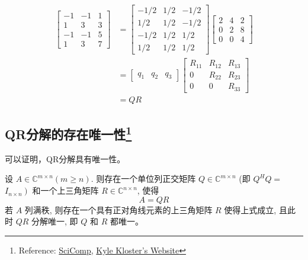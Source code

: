 \begin{example}
    $$
\begin{aligned}
\left[\begin{array}{rrr}
-1 & -1 & 1 \\
1 & 3 & 3 \\
-1 & -1 & 5 \\
1 & 3 & 7
\end{array}\right] &=\left[\begin{array}{rrr}
-1 / 2 & 1 / 2 & -1 / 2 \\
1 / 2 & 1 / 2 & -1 / 2 \\
-1 / 2 & 1 / 2 & 1 / 2 \\
1 / 2 & 1 / 2 & 1 / 2
\end{array}\right]\left[\begin{array}{rrr}
2 & 4 & 2 \\
0 & 2 & 8 \\
0 & 0 & 4
\end{array}\right] \\
&=\left[\begin{array}{lll}
q_{1} & q_{2} & q_{3}
\end{array}\right]\left[\begin{array}{ccc}
R_{11} & R_{12} & R_{13} \\
0 & R_{22} & R_{23} \\
0 & 0 & R_{33}
\end{array}\right] \\
&=Q R
\end{aligned}
$$
\end{example}

\subsection[QR分解的存在唯一性]{QR分解的存在唯一性\footnote{Reference: \href{http://math.ecnu.edu.cn/~jypan/Teaching/SciComp/}{SciComp}, \href{https://www.math.purdue.edu/~kkloste/cs515fa14/qr-uniqueness.pdf}{Kyle Kloster's Website}}}

可以证明，QR分解具有唯一性。


\begin{theorem}

    设 $A \in \mathbb{C}^{m \times n}(m \geq n)$. 则存在一个单位列正交矩阵 $Q \in \mathbb{C}^{m \times n}$ (即 $Q^{H} Q=$ $\left.I_{n \times n}\right)$ 和一个上三角矩阵 $R \in \mathbb{C}^{n \times n}$, 使得
$$
A=Q R
$$
若 $A$ 列满秩, 则存在一个具有正对角线元素的上三角矩阵 $R$ 使得上式成立, 且此时 $Q R$ 分解唯一, 即 $Q$ 和 $R$ 都唯一。
\end{theorem}

